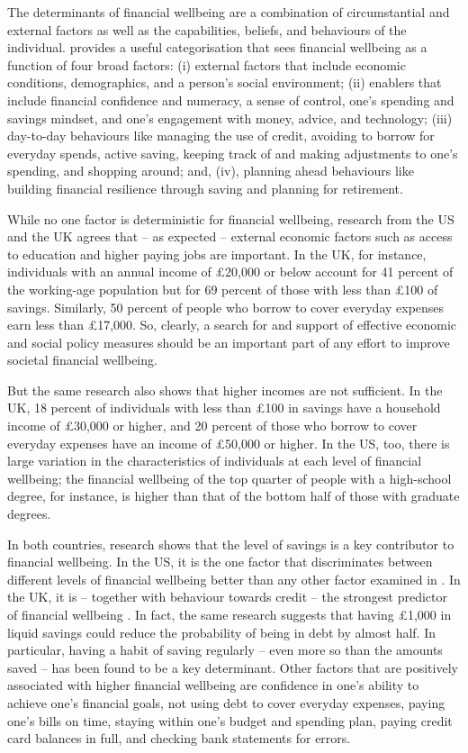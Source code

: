 The determinants of financial wellbeing are a combination of circumstantial and
external factors as well as the capabilities, beliefs, and behaviours of the
individual. \citet{mps2018building} provides a useful categorisation that sees
financial wellbeing as a function of four broad factors: (i) external factors that
include economic conditions, demographics, and a person's social environment; (ii)
enablers that include financial confidence and numeracy, a sense of control,
one's spending and savings mindset, and one's engagement with money, advice, and
technology; (iii) day-to-day behaviours like managing the use of credit, avoiding to
borrow for everyday spends, active saving, keeping track of and making
adjustments to one's spending, and shopping around; and, (iv), planning ahead
behaviours like building financial resilience through saving and planning for
retirement.

While no one factor is deterministic for financial wellbeing, research from the
US \citep{cfpb2017financial} and the UK \citep{mps2018building} agrees that -- as
expected -- external economic factors such as access to education and higher
paying jobs are important. In the UK, for instance, individuals with an annual
income of \pounds20,000 or below account for 41 percent of the working-age
population but for 69 percent of those with less than \pounds100 of savings.
Similarly, 50 percent of people who borrow to cover everyday expenses earn less
than \pounds17,000. So, clearly, a search for and support of effective economic
and social policy measures should be an important part of any effort to improve
societal financial wellbeing.

But the same research also shows that higher
incomes are not sufficient. In the UK, 18 percent of individuals with less than
\pounds 100 in savings have a household income of \pounds30,000 or higher, and
20 percent of those who borrow to cover everyday expenses have an income of
\pounds50,000 or higher. In the US, too, there is large variation in the
characteristics of individuals at each level of financial wellbeing; the
financial wellbeing of the top quarter of people with a high-school degree, for
instance, is higher than that of the bottom half of those with graduate
degrees.

In both countries, research shows that the level of savings is a key
contributor to financial wellbeing. In the US, it is the one factor that
discriminates between different levels of financial wellbeing better than any
other factor examined in \citep{cfpb2017financial}. In the UK, it is -- together
with behaviour towards credit -- the strongest predictor of financial wellbeing
\citep{mps2018building}. In fact, the same research suggests that having
\pounds1,000 in liquid savings could reduce the probability of being in debt by
almost half. In particular, having a habit of saving regularly -- even more so
than the amounts saved -- has been found to be a key determinant. Other
factors that are positively associated with higher financial wellbeing are
confidence in one's ability to achieve one's financial goals, not using debt to
cover everyday expenses, paying one's bills on time, staying within one's budget
and spending plan, paying credit card balances in full, and checking bank
statements for errors.

